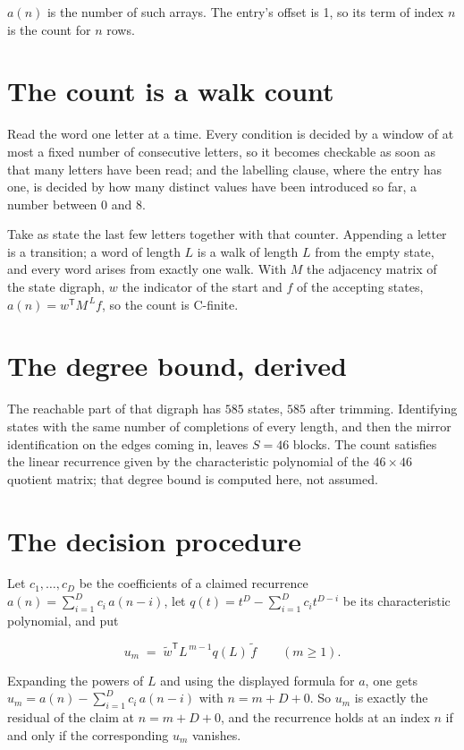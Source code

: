 \documentclass[11pt]{article}
\theoremstyle{definition}
\begin{document}
$a(n)$ is the number of such arrays. The entry's offset is 1, so its term of index $n$ is the count for $n$ rows.

\section{The count is a walk count}

Read the word one letter at a time. Every condition is decided by a window of at most a fixed number of consecutive letters, so it becomes checkable as soon as that many letters have been read; and the labelling clause, where the entry has one, is decided by how many distinct values have been introduced so far, a number between $0$ and 8.

Take as state the last few letters together with that counter. Appending a letter is a transition; a word of length $L$ is a walk of length $L$ from the empty state, and every word arises from exactly one walk. With $M$ the adjacency matrix of the state digraph, $w$ the indicator of the start and $f$ of the accepting states, $a(n) = w^{\mathsf T}M^{\,L}f$, so the count is C-finite.

\section{The degree bound, derived}

The reachable part of that digraph has $585$ states, $585$ after trimming. Identifying states with the same number of completions of every length, and then the mirror identification on the edges coming in, leaves $S = 46$ blocks. The count satisfies the linear recurrence given by the characteristic polynomial of the $46\times46$ quotient matrix; that degree bound is computed here, not assumed.

\section{The decision procedure}

Let $c_1,\dots,c_D$ be the coefficients of a claimed recurrence $a(n) = \sum_{i=1}^{D} c_i\,a(n-i)$, let $q(t) = t^{D} - \sum_{i=1}^{D} c_i t^{D-i}$ be its characteristic polynomial, and put

\[u_m \;=\; \tilde w^{\mathsf T} L^{\,m-1} q(L)\,\tilde f \qquad (m \ge 1).\]

Expanding the powers of $L$ and using the displayed formula for $a$, one gets $u_m = a(n) - \sum_{i=1}^{D} c_i\,a(n-i)$ with $n = m + D + 0$. So $u_m$ is exactly the residual of the claim at $n = m + D + 0$, and the recurrence holds at an index $n$ if and only if the corresponding $u_m$ vanishes.
\end{document}

